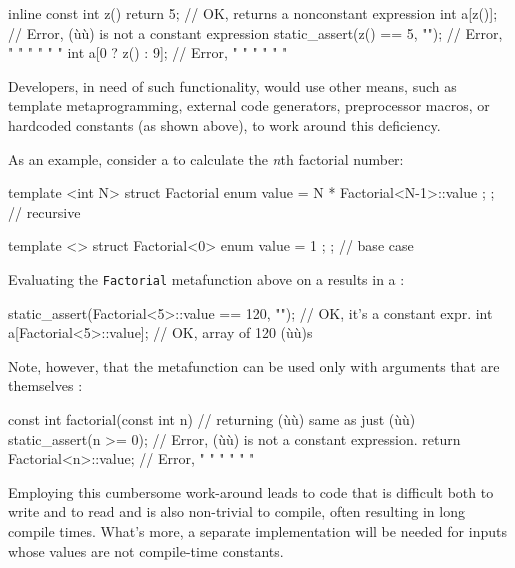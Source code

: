 \begin{emcppslisting}
inline const int z() { return 5; }  // OK, returns a nonconstant expression
int a[z()];                         // Error, (ù{}ù) is not a constant expression
static_assert(z() == 5, "");        // Error,  "     "  "  "      "         "
int a[0 ? z() : 9];                 // Error,  "     "  "  "      "         "
\end{emcppslisting}
    
\noindent Developers, in need of such functionality, would use other means, such
as template metaprogramming, external code generators, preprocessor
macros, or hardcoded constants (as shown above), to work around this
deficiency.

As an example, consider a  to calculate the
\emph{n}th factorial number:

\begin{emcppslisting}[emcppsbatch=e1]
template <int N>
struct Factorial { enum { value = N * Factorial<N-1>::value }; };  // recursive

template <>
struct Factorial<0> { enum { value = 1 }; };                       // base case
\end{emcppslisting}
    

\noindent Evaluating the \lstinline!Factorial! metafunction above on a
 results in a :

\begin{emcppslisting}[emcppsbatch=e1]
static_assert(Factorial<5>::value == 120, "");  // OK, it's a constant expr.
int a[Factorial<5>::value];                     // OK, array of 120 (ù{}ù)s
\end{emcppslisting}
    

\noindent Note, however, that the metafunction can be used only with arguments
that are themselves :

\begin{emcppslisting}
const int factorial(const int n)  // returning (ù{}ù) same as just (ù{}ù)
{
    static_assert(n >= 0);        // Error, (ù{}ù) is not a constant expression.
    return Factorial<n>::value;   // Error,  "   "  "  "     "         "
}
\end{emcppslisting}
    

\noindent Employing this cumbersome work-around leads to code that is difficult
both to write and to read and is also non-trivial to compile, often
resulting in long compile times. What's more, a separate implementation
will be needed for inputs whose values are not compile-time constants.

